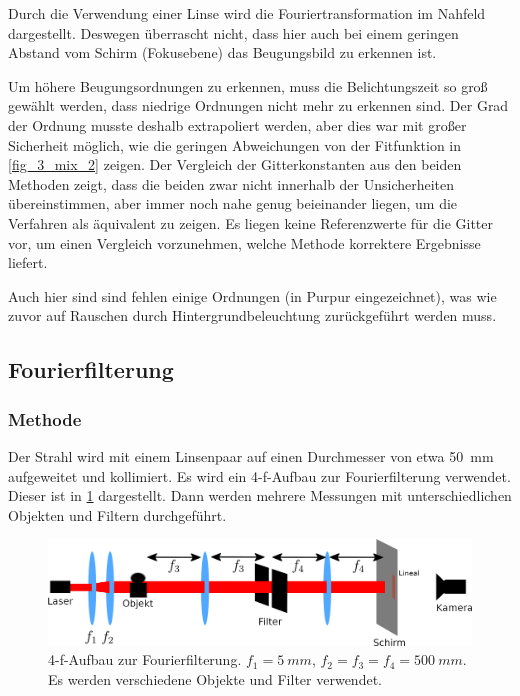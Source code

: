 \documentclass[
	a4paper,
	12pt,
	pagesize,
	ngerman
]{scrartcl}
\begin{document}
Durch die Verwendung einer Linse wird die Fouriertransformation im Nahfeld dargestellt. %
Deswegen überrascht nicht, dass hier auch bei einem geringen Abstand vom Schirm (Fokusebene) das Beugungsbild zu erkennen ist.

Um höhere Beugungsordnungen zu erkennen, muss die Belichtungszeit so groß gewählt werden, dass niedrige Ordnungen nicht mehr zu erkennen sind.
Der Grad der Ordnung musste deshalb extrapoliert werden, aber dies war mit großer Sicherheit möglich, wie die geringen Abweichungen von der Fitfunktion in \cref{fig_3_mix_2} zeigen.
Der Vergleich der Gitterkonstanten aus den beiden Methoden zeigt, dass die beiden zwar nicht innerhalb der Unsicherheiten übereinstimmen, aber immer noch nahe genug beieinander liegen, um die Verfahren als äquivalent zu zeigen.
Es liegen keine Referenzwerte für die Gitter vor, um einen Vergleich vorzunehmen, welche Methode korrektere Ergebnisse liefert.

Auch hier sind sind fehlen einige Ordnungen (in Purpur eingezeichnet), was wie zuvor auf Rauschen durch Hintergrundbeleuchtung zurückgeführt werden muss.

	\subsection{Fourierfilterung}

	\subsubsection*{Methode}

		Der Strahl wird mit einem Linsenpaar auf einen Durchmesser von etwa \SI{50}{mm} aufgeweitet und kollimiert.
		Es wird ein 4-f-Aufbau zur Fourierfilterung verwendet.
		Dieser ist in \cref{fig_4f} dargestellt.
		Dann werden mehrere Messungen mit unterschiedlichen Objekten und Filtern durchgeführt.

	\begin{figure}[H]
			\includegraphics[width=1\linewidth]{img/4f}
			\caption{
				4-f-Aufbau zur Fourierfilterung. $f_1= \SI{5}{mm}$, $f_2 = f_3 = f_4 = \SI{500}{mm}$. Es werden verschiedene Objekte und Filter verwendet.
			}
			\label{fig_4f}
	\end{figure}
\end{document}
